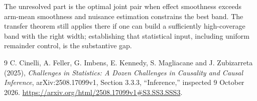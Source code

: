 \documentclass[11pt]{article}
\theoremstyle{remark}
\begin{document}
The unresolved part is the optimal joint pair when effect smoothness exceeds arm-mean smoothness and nuisance estimation constrains the best band. The transfer theorem still applies there if one can build a sufficiently high-coverage band with the right width; establishing that statistical input, including uniform remainder control, is the substantive gap.

\begin{thebibliography}{9}
 C. Cinelli, A. Feller, G. Imbens, E. Kennedy, S. Magliacane and J. Zubizarreta (2025), \emph{Challenges in Statistics: A Dozen Challenges in Causality and Causal Inference}, arXiv:2508.17099v1, Section 3.3.3, ``Inference,'' inspected 9 October 2026. \url{https://arxiv.org/html/2508.17099v1#S3.SS3.SSS3}.
\end{thebibliography}
\end{document}
